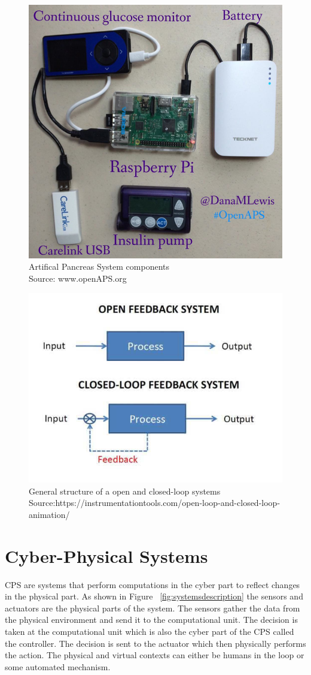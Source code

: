 \begin{figure}
	\centering
	\includegraphics[width=0.7\linewidth]{Images/APSrig}
	\caption{Artifical Pancreas System components \\
		Source: www.openAPS.org}
	\label{fig:apsrig}
\end{figure}



\begin{figure}
	\centering
	\includegraphics[width=0.7\linewidth]{Images/closedvsopen}
	\caption{General structure of a open and closed-loop systems 
		Source:https://instrumentationtools.com/open-loop-and-closed-loop-animation/ }
	\label{fig:closedvsopen}
\end{figure}


\section{Cyber-Physical Systems}
\ac{CPS} are systems that perform computations in the cyber part to reflect changes in the physical  part.   
As shown in Figure ~\ref{fig:systemsdescription} the sensors and actuators are the physical parts of the system. 
The sensors gather the data from the physical environment and send it to the computational unit. 
The decision is taken at the computational unit which is also the cyber part of the \ac{CPS} called the controller.
The decision is sent to the actuator which then physically performs the action.
The physical and virtual contexts can either be humans in the loop or some automated mechanism.

